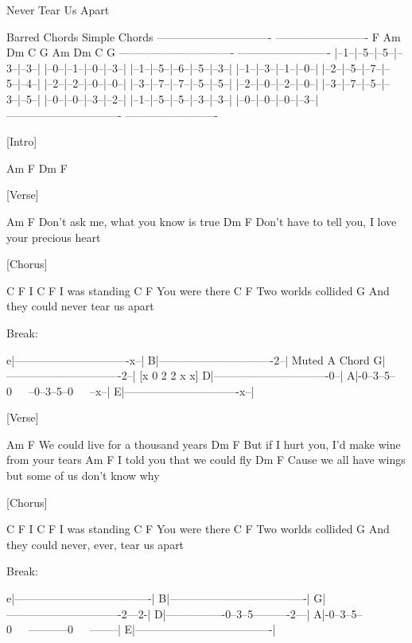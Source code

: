 Never Tear Us Apart


         Barred Chords                  Simple Chords
-------------------------------   -------------------------
   F     Am    Dm    C     G         Am    Dm    C     G
-------------------------------   -------------------------
|--1--|--5--|--5--|--3--|--3--|   |--0--|--1--|--0--|--3--|
|--1--|--5--|--6--|--5--|--3--|   |--1--|--3--|--1--|--0--|
|--2--|--5--|--7--|--5--|--4--|   |--2--|--2--|--0--|--0--|
|--3--|--7--|--7--|--5--|--5--|   |--2--|--0--|--2--|--0--|
|--3--|--7--|--5--|--3--|--5--|   |--0--|--0--|--3--|--2--|
|--1--|--5--|--5--|--3--|--3--|   |--0--|--0--|--0--|--3--|
-------------------------------   -------------------------

[Intro]

Am F Dm F


[Verse]

      Am               F
Don't ask me, what you know is true
              Dm          F
Don't have to tell you, I love your precious heart


[Chorus]

C   F
I
      C        F
I was standing
         C        F
You were there
           C        F
Two worlds collided
               G
And they could never tear us apart


Break:  

e|-------------------------------x--|
B|-------------------------------2--| Muted A Chord
G|-------------------------------2--| [x 0 2 2 x x]
D|-------------------------------0--|
A|-0--3--5--0~~~--0--3--5--0~~~--x--| 
E|-------------------------------x--|


[Verse]

         Am         F
We could live for a thousand years
         Dm                 F
But if I hurt you, I'd make wine from your tears
  Am              F
I told you that we could fly
         Dm                 F
Cause we all have wings but some of us don't know why


[Chorus]

C   F
I
      C        F
I was standing
         C       F
You were there
           C        F
Two worlds collided
               G
And they could never, ever, tear us apart

Break:

e|-------------------------------------|
B|-------------------------------------|
G|-------------------------------2---2-|
D|----------------0--3--5----------2---|
A|-0--3--5--0~~~-----------0~~~--------| 
E|-------------------------------------|

